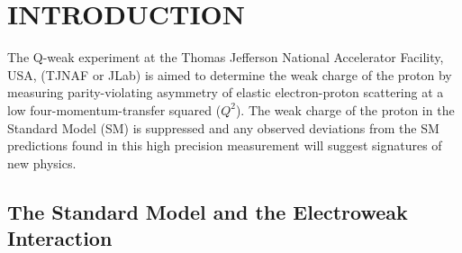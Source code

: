 \chapter{INTRODUCTION}
\label{INTRODUCTION}

The Q-weak experiment at the Thomas Jefferson National Accelerator Facility, USA, (TJNAF or JLab) is aimed to determine the weak charge of the proton by measuring parity-violating asymmetry of elastic electron-proton scattering at a low four-momentum-transfer squared ($Q^{2}$). The weak charge of the proton in the Standard Model (SM) is suppressed and any observed deviations from the SM predictions found in this high precision measurement will suggest signatures of new physics.


\section{The Standard Model and the Electroweak Interaction}
\label{The Standard Model and the Electroweak Interaction}

